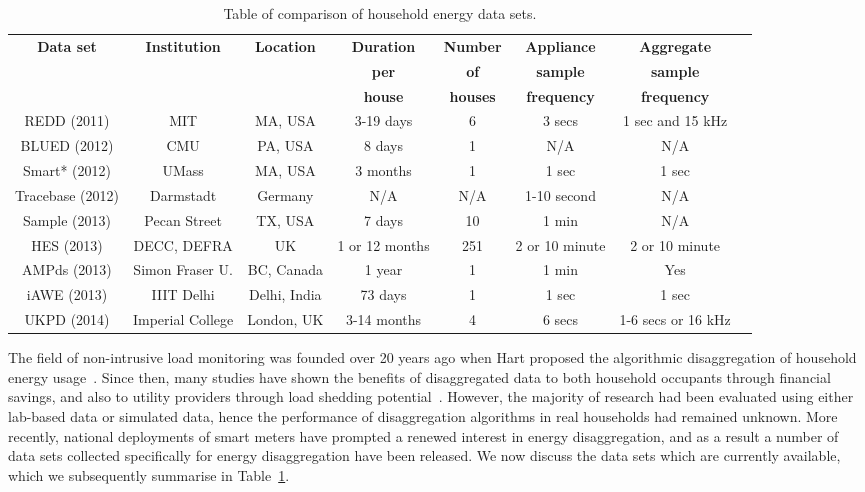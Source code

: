 \documentclass{sig-alternate}
\newcommand{\tabref}[1]{Table~\ref{#1}}
\begin{document}
\begin{table}[]
  \centering
  \begin{tabular}{c c c c c c c c}
    \hline
    \bf Data set & \bf Institution & \bf Location & \bf Duration & \bf Number & \bf Appliance & \bf Aggregate\\
    \bf  & \bf  & \bf  & \bf per  & \bf of & \bf sample & \bf sample\\
    \bf  & \bf  & \bf  & \bf house & \bf houses & \bf frequency & \bf frequency\\
    \hline
    REDD (2011) & MIT & MA, USA & 3-19 days & 6 & 3 secs & 1 sec and 15 kHz\\
    BLUED (2012) & CMU & PA, USA & 8 days & 1 & N/A & N/A\\
    Smart* (2012) & UMass & MA, USA & 3 months & 1 & 1 sec & 1 sec\\
    Tracebase (2012) & Darmstadt & Germany & N/A & N/A & 1-10 second & N/A\\
    Sample (2013) & Pecan Street & TX, USA & 7 days & 10 & 1 min & N/A\\
    HES (2013) & DECC, DEFRA & UK & 1 or 12 months & 251 & 2 or 10 minute
    & 2 or 10 minute\\
    AMPds (2013) & Simon Fraser U. & BC, Canada & 1 year & 1 & 1 min & Yes\\
    iAWE (2013) & IIIT Delhi & Delhi, India & 73 days & 1 & 1 sec & 1 sec\\
    UKPD (2014) & Imperial College & London, UK & 3-14 months & 4 & 6 secs & 1-6 secs or 16 kHz \\
    \hline
  \end{tabular}
  \caption{Table of comparison of household energy data sets.}
  \label{table:datasets}
\end{table}

\noindent
The field of non-intrusive load monitoring was founded over 20 years ago when Hart proposed the algorithmic disaggregation of household energy usage~\cite{hart_1992}. Since then, many studies have shown the benefits of disaggregated data to both household occupants through financial savings, and also to utility providers through load shedding potential~\cite{zeifman_2011,armel_2013}. However, the majority of research had been evaluated using either lab-based data or simulated data, hence the performance of disaggregation algorithms in real households had remained unknown. More recently, national deployments of smart meters have prompted a renewed interest in energy disaggregation, and as a result a number of data sets collected specifically for energy disaggregation have been released. We now discuss the data sets which are currently available, which we subsequently summarise in \tabref{table:datasets}.
\end{document}
